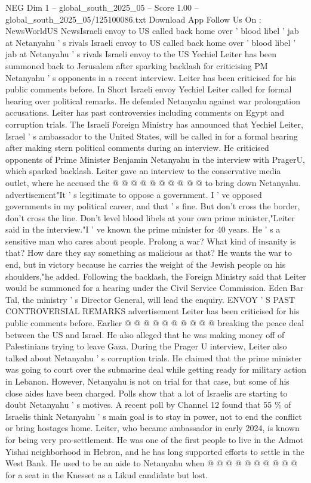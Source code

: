 \begin{textsample}{NEG Dim 1 – global\_south\_2025\_05 – Score 1.00 – global\_south\_2025\_05/125100086.txt}  \label{ex:f1_neg_381}
Download App Follow Us On : NewsWorldUS NewsIsraeli envoy to US called back home over ' blood libel ' jab at Netanyahu ' s rivals Israeli envoy to US called back home over ' blood libel ' jab at Netanyahu ' s rivals Israeli envoy to the US Yechiel Leiter has been summoned back to Jerusalem after sparking backlash for criticising PM Netanyahu ' s opponents in a recent interview.
Leiter has been criticised for his public comments before.
In Short Israeli envoy Yechiel Leiter called for formal hearing over political remarks.
He defended Netanyahu against war prolongation accusations.
Leiter has past controversies including comments on Egypt and corruption trials.
The Israeli Foreign Ministry has announced that Yechiel Leiter, Israel ' s ambassador to the United States, will be called in for a formal hearing after making stern political comments during an interview.
He criticised opponents of Prime Minister Benjamin Netanyahu in the interview with PragerU, which sparked backlash.
Leiter gave an interview to the conservative media outlet, where he accused the @ @ @ @ @ @ @ @ @ @ to bring down Netanyahu. advertisement"It ' s legitimate to oppose a government.
I ' ve opposed governments in my political career, and that ' s fine.
But don't cross the border, don't cross the line.
Don't level blood libels at your own prime minister,"Leiter said in the interview."I ' ve known the prime minister for 40 years.
He ' s a sensitive man who cares about people.
Prolong a war?
What kind of insanity is that?
How dare they say something as malicious as that?
He wants the war to end, but in victory because he carries the weight of the Jewish people on his shoulders,"he added.
Following the backlash, the Foreign Ministry said that Leiter would be summoned for a hearing under the Civil Service Commission.
Eden Bar Tal, the ministry ' s Director General, will lead the enquiry.
ENVOY ' S PAST CONTROVERSIAL REMARKS advertisement Leiter has been criticised for his public comments before.
Earlier @ @ @ @ @ @ @ @ @ @ breaking the peace deal between the US and Israel.
He also alleged that he was making money off of Palestinians trying to leave Gaza.
During the Prager U interview, Leiter also talked about Netanyahu ' s corruption trials.
He claimed that the prime minister was going to court over the submarine deal while getting ready for military action in Lebanon.
However, Netanyahu is not on trial for that case, but some of his close aides have been charged.
Polls show that a lot of Israelis are starting to doubt Netanyahu ' s motives.
A recent poll by Channel 12 found that 55 \% of Israelis think Netanyahu ' s main goal is to stay in power, not to end the conflict or bring hostages home.
Leiter, who became ambassador in early 2024, is known for being very pro-settlement.
He was one of the first people to live in the Admot Yishai neighborhood in Hebron, and he has long supported efforts to settle in the West Bank.
He used to be an aide to Netanyahu when @ @ @ @ @ @ @ @ @ @ for a seat in the Knesset as a Likud candidate but lost.

\end{textsample}
